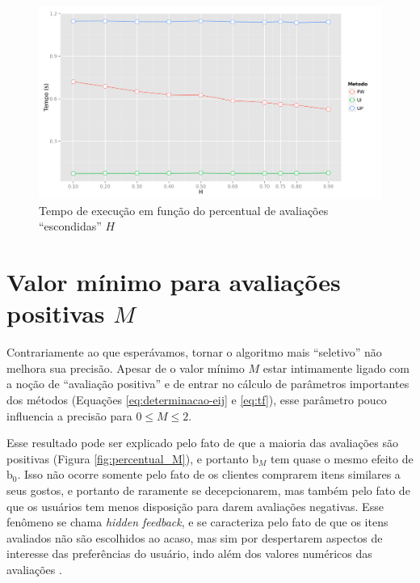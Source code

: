 \begin{figure}[htp]
    \begin{center}
    \includegraphics[width=1\textwidth]{img/time_H}
    \end{center}
    \label{fig:time_H}
    \caption{Tempo de execução em função do percentual de avaliações ``escondidas'' $H$}
\end{figure}


\section{Valor mínimo para avaliações positivas $M$} %
\label{sec:valor_m_nimo_para_avalia_es_positivas_}

Contrariamente ao que esperávamos, tornar o algoritmo mais ``seletivo'' não melhora sua precisão. Apesar de o valor mínimo $M$ estar intimamente ligado com a noção de ``avaliação positiva'' e de entrar no cálculo de parâmetros importantes dos métodos (Equações \ref{eq:determinacao-eij} e \ref{eq:tf}), esse parâmetro pouco influencia a precisão para $0 \leq M \leq 2$. 

Esse resultado pode ser explicado pelo fato de que a maioria das avaliações são positivas (Figura \ref{fig:percentual_M}), e portanto $\mathrm{b}_M$ tem quase o mesmo efeito de $\mathrm{b}_0$. Isso não ocorre somente pelo fato de os clientes comprarem itens similares a seus gostos, e portanto de raramente se decepcionarem, mas também pelo fato de que os usuários tem menos disposição para darem avaliações negativas. Esse fenômeno se chama \textit{hidden feedback}, e se caracteriza pelo fato de que os itens avaliados não são escolhidos ao acaso, mas sim por despertarem aspectos de interesse das preferências do usuário, indo além dos valores numéricos das avaliações \cite{lops2011content-chap5}.

